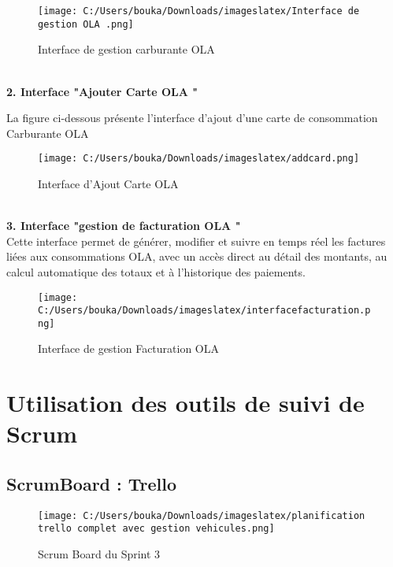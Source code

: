\documentclass[a4paper,11pt]{report}
\begin{document}
\begin{figure}[H]
  \centering
  \texttt{[image: C:/Users/bouka/Downloads/imageslatex/Interface de gestion OLA .png]}
  \caption{Interface de gestion carburante OLA}
  \label{fig:clone-result}
\end{figure}




\textbf{      \\ 2. Interface  "Ajouter Carte OLA "}

La figure ci-dessous présente l’interface d'ajout d'une carte de consommation Carburante OLA

\begin{figure}[H]
  \centering
  \texttt{[image: C:/Users/bouka/Downloads/imageslatex/addcard.png]}
  \caption{Interface d'Ajout Carte OLA}
  \label{fig:clone-result}
\end{figure}

\textbf{      \\ 3. Interface  "gestion de facturation OLA "}
\\
Cette interface permet de générer, modifier et suivre en temps réel les factures liées aux consommations OLA, avec un accès direct au détail des montants, au calcul automatique des totaux et à l’historique des paiements.
\begin{figure}[H]
  \centering
  \texttt{[image: C:/Users/bouka/Downloads/imageslatex/interfacefacturation.png]}
  \caption{Interface de gestion Facturation OLA}
  \label{fig:clone-result}
\end{figure}











\section{Utilisation des outils de suivi de Scrum}

\subsection{ScrumBoard : Trello}


\begin{figure}[H]
  \centering
  \texttt{[image: C:/Users/bouka/Downloads/imageslatex/planification trello complet avec gestion vehicules.png]}
  \caption{Scrum Board du Sprint 3}
  \label{fig:clone-result}
\end{figure}
\end{document}
